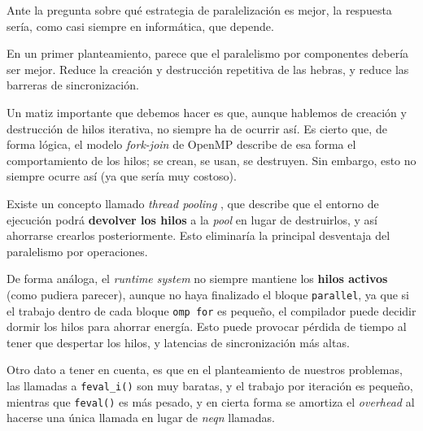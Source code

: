 Ante la pregunta sobre qué estrategia de paralelización es mejor, la respuesta sería, como casi siempre en informática, que depende.

En un primer planteamiento, parece que el paralelismo por componentes debería ser mejor. Reduce la creación y destrucción repetitiva de las hebras, y reduce las barreras de sincronización.

Un matiz importante que debemos hacer es que, aunque hablemos de creación y destrucción de hilos iterativa, no siempre ha de ocurrir así. Es cierto que, de forma lógica, el modelo \textit{fork-join} de OpenMP describe de esa forma el comportamiento de los hilos; se crean, se usan, se destruyen. \cite{Jin2024} Sin embargo, esto no siempre ocurre así (ya que sería muy costoso).

Existe un concepto llamado \textit{thread pooling} \cite{Barlas2023}, que describe que el entorno de ejecución podrá \textbf{devolver los hilos} a la \textit{pool} en lugar de destruirlos, y así ahorrarse crearlos posteriormente. Esto eliminaría la principal desventaja del paralelismo por operaciones. 

De forma análoga, el \textit{runtime system} \cite{Chapman2007} no siempre mantiene los \textbf{hilos activos} (como pudiera parecer), aunque no haya finalizado el bloque \texttt{parallel}, ya que si el trabajo dentro de cada bloque \texttt{omp for} es pequeño, el compilador puede decidir dormir los hilos para ahorrar energía. Esto puede provocar pérdida de tiempo al tener que despertar los hilos, y latencias de sincronización más altas.

Otro dato a tener en cuenta, es que en el planteamiento de nuestros problemas, las llamadas a \texttt{feval\_i()} son muy baratas, y el trabajo por iteración es pequeño, mientras que \texttt{feval()} es más pesado, y en cierta forma se amortiza el \textit{overhead} al hacerse  una única llamada en lugar de \textit{neqn} llamadas.

